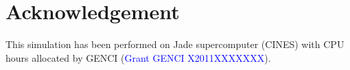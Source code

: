 \section*{Acknowledgement}

This simulation has been performed on Jade supercomputer (CINES) with CPU hours allocated by GENCI (\textcolor{blue}{Grant GENCI X2011XXXXXXX}).

